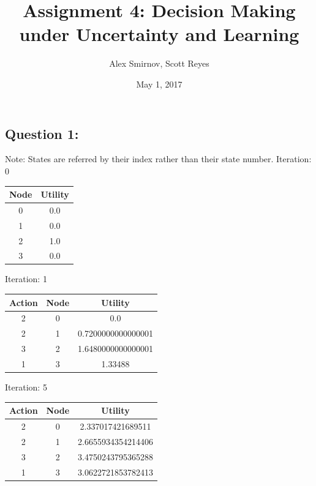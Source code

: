 \documentclass[11pt, oneside]{article}   	%
\title{Assignment 4: Decision Making under Uncertainty and Learning}
\author{Alex Smirnov, Scott Reyes}
\date{May 1, 2017}
\begin{document}
\maketitle
\begin{flushleft}

\section*{Question 1:}
Note: States are referred by their index rather than their state number.\linebreak
Iteration: 0
\begin{center}
\begin{tabular}{|c|c|}
\hline
Node &	Utility \\ \hline
0 &	0.0 \\ \hline
1 &	0.0 \\ \hline
2 &	1.0 \\ \hline
3 &	0.0 \\ \hline
\end{tabular}
\end{center}

Iteration: 1
\begin{center}
\begin{tabular}{|c|c|c|}
\hline
Action & Node &	Utility \\ \hline
2 & 0 &	0.0 \\ \hline
2 & 1 &	0.7200000000000001 \\ \hline
3 & 2 &	1.6480000000000001 \\ \hline
1 & 3 &	1.33488 \\ \hline
\end{tabular}
\end{center}

Iteration: 5
\begin{center}
\begin{tabular}{|c|c|c|}
\hline
Action & Node &	Utility \\ \hline
2 & 0 &	2.337017421689511 \\ \hline
2 & 1 &	2.6655934354214406 \\ \hline
3 & 2 &	3.4750243795365288 \\ \hline
1 & 3 &	3.0622721853782413 \\ \hline
\end{tabular}
\end{center}


\end{flushleft}
\end{document}
